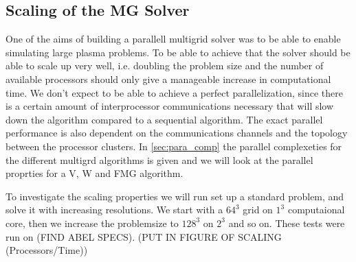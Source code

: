 \subsection{Scaling of the MG Solver}
	One of the aims of building a parallell multigrid solver was to be able
	to enable simulating large plasma problems. To be able to achieve that the solver
	should be able to scale up very well, i.e. doubling the problem size and the number
	of available processors should only give a manageable increase in computational time.
	We don't expect to be able to achieve a perfect parallelization, since there is
	a certain amount of interprocessor communications necessary that will slow down
	the algorithm compared to a sequential algorithm. The exact parallel performance
	is also dependent on the communications channels and the topology between the processor clusters.
	In \cref{sec:para_comp} the parallel
	complexeties for the different multigrd algorithms is given and we will look at
	the parallel proprties for a V, W and FMG algorithm.


	To investigate the scaling properties we will run set up a standard problem,
	and solve it with increasing resolutions. We start with a \(64^3\) grid on
 	\(1^3\) computaional core, then we increase the problemsize to \(128^3\) on \(2^3\)
	and so on. These tests were run on (\large{FIND ABEL SPECS}).
	\large{(PUT IN FIGURE OF SCALING (Processors/Time))}
